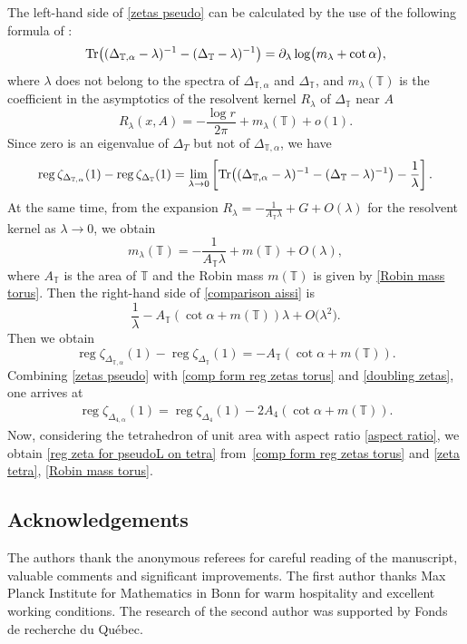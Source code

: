\documentclass[pdftex]{sigma}
\numberwithin{equation}{section}
\theoremstyle{definition}
\begin{document}
The left-hand side of \eqref{zetas pseudo} can be calculated by the use of the following formula of \cite{AisHK}:
\begin{equation}
\label{comparison aissi}
{\rm Tr}\bigl((\Delta_{\mathbb{T},\alpha}-\lambda)^{-1}-(\Delta_{\mathbb{T}}-\lambda)^{-1}\bigr)=\partial_\lambda\log \bigl(m_\lambda+\operatorname{cot}\alpha\bigr),
\end{equation}
where $\lambda$ does not belong to the spectra of $\Delta_{\mathbb{T},\alpha}$ and $\Delta_{\mathbb{T}}$, and $m_\lambda(\mathbb{T})$ is the coefficient in the asymptotics of the resolvent kernel $R_\lambda$ of $\Delta_{\mathbb{T}}$ near $A$
\[R_\lambda(x,A)=-\frac{\log r}{2\pi}+m_\lambda(\mathbb{T})+o(1).\]
Since zero is an eigenvalue of $\Delta_T$ but not of $\Delta_{\mathbb{T},\alpha}$, we have
\[
\operatorname{reg}\zeta_{\Delta_{\mathbb{T},\alpha}}(1)-\operatorname{reg}\zeta_{\Delta_{\mathbb{T}}}(1)=\lim_{\lambda\to 0}\left[{\rm Tr}\bigl((\Delta_{\mathbb{T},\alpha}-\lambda)^{-1}-(\Delta_{\mathbb{T}}-\lambda)^{-1}\bigr)-\frac{1}{\lambda}\right].
\]
At the same time, from the expansion $R_\lambda=-\frac{1}{A_{\mathbb{T}}\lambda}+G+O(\lambda)$ for the resolvent kernel as $\lambda\to 0$, we obtain
\[m_\lambda(\mathbb{T})=-\frac{1}{A_{\mathbb{T}}\lambda}+m(\mathbb{T})+O(\lambda),\]
where $A_{\mathbb{T}}$ is the area of $\mathbb{T}$ and the Robin mass $m(\mathbb{T})$ is given by \eqref{Robin mass torus}. Then the right-hand side of \eqref{comparison aissi} is
\[\frac{1}{\lambda}-A_{\mathbb{T}}(\operatorname{cot}\alpha+m(\mathbb{T}))\lambda+O\bigl(\lambda^2\bigr).\]
Then we obtain
\begin{equation}
\label{comp form reg zetas torus}
\operatorname{reg}\zeta_{\Delta_{\mathbb{T},\alpha}}(1)-\operatorname{reg}\zeta_{\Delta_{\mathbb{T}}}(1)=-A_{\mathbb{T}}(\operatorname{cot}\alpha+m(\mathbb{T})).
\end{equation}
Combining \eqref{zetas pseudo} with \eqref{comp form reg zetas torus} and \eqref{doubling zetas}, one arrives at
\begin{align*}
\operatorname{reg}\zeta_{\Delta_{4,\alpha}}(1)=\operatorname{reg}\zeta_{\Delta_{4}}(1)-2A_{4}(\operatorname{cot}\alpha+m(\mathbb{T})).
\end{align*}
Now, considering the tetrahedron of unit area with aspect ratio \eqref{aspect ratio}, we obtain \eqref{reg zeta for pseudoL on tetra} from~\eqref{comp form reg zetas torus} and \eqref{zeta tetra}, \eqref{Robin mass torus}.


\subsection*{Acknowledgements}
The authors thank the anonymous referees for careful reading of the manuscript, valuable comments and significant improvements.
The first author thanks Max Planck Institute for Mathematics in Bonn for warm hospitality and excellent working conditions. The research of the second author was supported by Fonds de recherche du Qu\'ebec.
\end{document}
